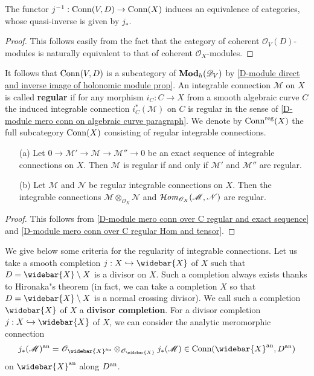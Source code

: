 \begin{lemma}\label{D-module algebraic mero conn equivalence of cat}
The functor $j^{-1}:\mathrm{Conn}(V,D)\to\mathrm{Conn}(X)$ induces an equivalence of categories, whose quasi-inverse is given by $j_*$.
\end{lemma}
\begin{proof}
This follows easily from the fact that the category of coherent $\mathscr{O}_V(D)$-modules is naturally equivalent to that of coherent $\mathscr{O}_X$-modules.
\end{proof}
It follows that $\mathrm{Conn}(V,D)$ is a subcategory of $\mathbf{Mod}_h(\mathscr{D}_V)$ by \cref{D-module direct and inverse image of holonomic module prop}. An integrable connection $\mathscr{M}$ on $X$ is called \textbf{regular} if for any morphism $i_C:C\to X$ from a smooth algebraic curve $C$ the induced integrable connection $i^*_C(\mathscr{M})$ on $C$ is regular in the sense of \ref{D-module mero conn on algebraic curve paragraph}. We denote by $\mathrm{Conn}^{\mathrm{reg}}(X)$ the full subcategory $\mathrm{Conn}(X)$ consisting of regular integrable connections.

\begin{proposition}\label{D-module algebraic mero conn regular prop}
\mbox{}
\begin{enumerate}
    \item[(a)] Let $0\to\mathscr{M}'\to\mathscr{M}\to\mathscr{M}''\to 0$ be an exact sequence of integrable connections on $X$. Then $\mathscr{M}$ is regular if and only if $\mathscr{M}'$ and $\mathscr{M}''$ are regular.
    \item[(b)] Let $\mathscr{M}$ and $\mathscr{N}$ be regular integrable connections on $X$. Then the integrable connections $\mathscr{M}\otimes_{\mathscr{O}_X}\mathscr{N}$ and $\operatorname{\mathcal{H}\hspace*{-0.4pt}\textit{om}\hspace{0.5pt}}_{\mathscr{O}_X}(\mathscr{M},\mathscr{N})$ are regular. 
\end{enumerate}

\end{proposition}
\begin{proof}
This follows from \cref{D-module mero conn over C regular and exact sequence} and \cref{D-module mero conn over C regular Hom and tensor}.
\end{proof}

We give below some criteria for the regularity of integrable connections. Let us take a smooth completion $j:X\hookrightarrow\widebar{X}$ of $X$ such that $D=\widebar{X}\setminus X$ is a divisor on $X$. Such a completion always exists thanks to Hironaka"s theorem (in fact, we can take a completion $X$ so that $D=\widebar{X}\setminus X$ is a normal crossing divisor). We call such a completion $\widebar{X}$ of $X$ a \textbf{divisor completion}. For a divisor completion $j:X\hookrightarrow\widebar{X}$ of $X$, we can consider the analytic meromorphic connection
\[j_*(\mathscr{M})^{\an}=\mathscr{O}_{\widebar{X}^{\an}}\otimes_{\mathscr{O}_{\widebar{X}}}j_*(\mathscr{M})\in\Conn(\widebar{X}^{\an},D^{\an})\]
on $\widebar{X}^{\an}$ along $D^{\mathrm{an}}$.

